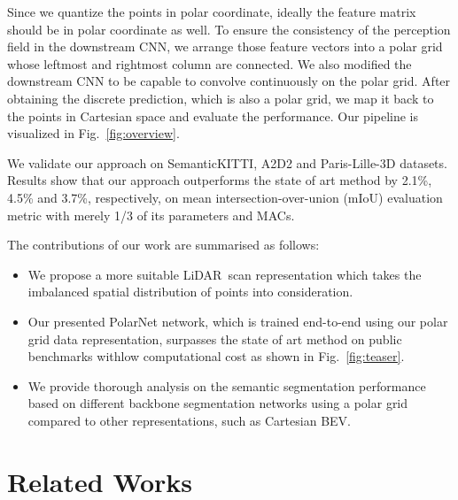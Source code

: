 \documentclass[10pt,twocolumn,letterpaper]{article}
\newcommand{\lidar}{\mbox{LiDAR }}
\begin{document}
Since we quantize the points in polar coordinate, ideally the feature matrix should be in polar coordinate as well. To ensure the consistency of the perception field in the downstream CNN, we arrange those feature vectors into a polar grid whose leftmost and rightmost column are connected. We also modified the downstream CNN to be capable to convolve continuously on the polar grid. After obtaining the discrete prediction, which is also a polar grid, we map it back to the points in Cartesian space and evaluate the performance. Our pipeline is visualized in Fig.~\ref{fig:overview}.

We validate our approach on SemanticKITTI\cite{behley2019iccv}, A2D2\cite{aev2019} and Paris-Lille-3D\cite{roynard2018paris} datasets. Results show that our approach outperforms the state of art method by 2.1\%, 4.5\% and 3.7\%, respectively, on mean intersection-over-union (mIoU) evaluation metric with merely 1/3 of its parameters and MACs. 

The contributions of our work are summarised as follows:

\begin{itemize}
    \item We propose a more suitable \lidar scan representation which takes the imbalanced spatial distribution of points into consideration.
    \item Our presented PolarNet network, which is trained end-to-end using our polar grid data representation, surpasses the state of art method on public benchmarks withlow computational cost as shown in Fig.~\ref{fig:teaser}.
    \item We provide thorough analysis on the semantic segmentation performance based on different backbone segmentation networks using a polar grid compared to other representations, such as Cartesian BEV. 
    
\end{itemize}

 

\section{Related Works}
\end{document}
